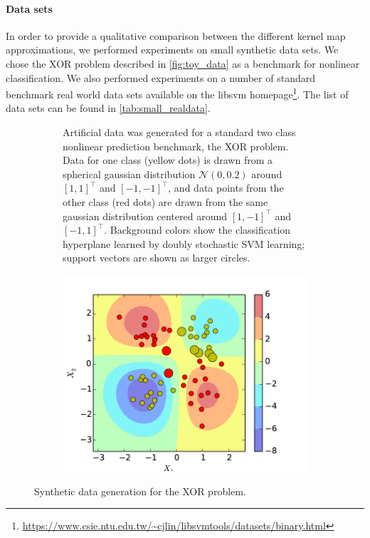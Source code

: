 \documentclass{article} %
\begin{document}
\paragraph{Data sets}
In order to provide a qualitative comparison between the different kernel map approximations, we performed experiments on small synthetic data sets. We chose the XOR problem described in \autoref{fig:toy_data} as a benchmark for nonlinear classification. We also performed experiments on a number of standard benchmark real world data sets available on the libsvm homepage\footnote{\url{https://www.csie.ntu.edu.tw/~cjlin/libsvmtools/datasets/binary.html}}. The list of data sets can be found in \autoref{tab:small_realdata}. 
%
\begin{figure}[!ht]
    \centering
           \hfill
        \begin{subfigure}[b]{0.5\textwidth}
         Artificial data was generated for a standard two class nonlinear prediction benchmark, the XOR problem.
        Data for one class (yellow dots) is drawn from a spherical gaussian distribution $\mathcal{N}(0,0.2)$ around $[1,1]^\top$ and $[-1,-1]^\top$, and data points from the other class (red dots) are drawn from the same gaussian distribution centered around $[1,-1]^\top$ and $[-1,1]^\top$. 
         Background colors show the classification hyperplane learned by doubly stochastic SVM learning; support vectors are shown as larger circles.\\     
        \end{subfigure}
	\hfill
         \begin{subfigure}[b]{0.4\textwidth}
         \centering
        \includegraphics[width=1\columnwidth]{imgs/svm_kernel}
               \label{fig:toy_data}
        \end{subfigure}

        \caption{\label{fig:toy_data} Synthetic data generation for the XOR problem.}
\end{figure}
\end{document}
